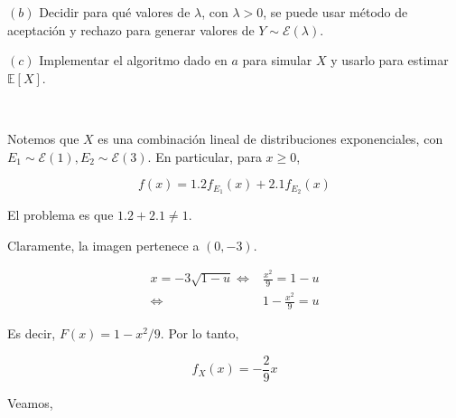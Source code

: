 \documentclass[a4paper, 12pt]{article}
\begin{document}
$(b)$ Decidir para qué valores de $\lambda$, con $\lambda > 0$, se puede usar
método de aceptación y rechazo para generar valores de $Y \sim
\mathcal{E}(\lambda)$.

$(c)$ Implementar el algoritmo dado en $a$ para simular $X$ y usarlo para
estimar $\mathbb{E}\left[ X \right] $.

~ 

Notemos que $X$ es una combinación lineal de distribuciones exponenciales, con 
$E_1 \sim \mathcal{E}(1), E_2 \sim \mathcal{E}(3)$. En particular, para $x \geq
0$,

\begin{equation*}
  f(x) = 1.2f_{E_1}(x) + 2.1 f_{E_2}(x)
\end{equation*}

El problema es que $1.2 + 2.1 \neq 1$.

\pagebreak 

Claramente, la imagen pertenece a $(0, -3)$.

\begin{align*}
  x = -3  \sqrt{1 - u}  
  \iff &\frac{x^2}{9} = 1 - u \\ 
  \iff&1 - \frac{x^2}{9}  = u
\end{align*}

Es decir, $F(x) = 1 - x^2 / 9$. Por lo tanto, 

\begin{equation*}
  f_X(x) = -\frac{2}{9}x
\end{equation*}

Veamos, 

\begin{equation*}
  
\end{equation*}
\end{document}

